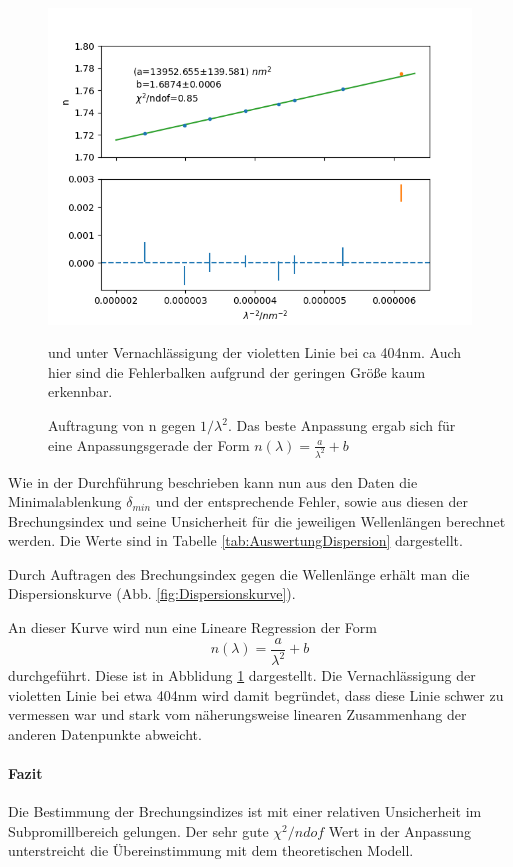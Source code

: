 \documentclass[12pt,a4paper]{article}
\begin{document}
	\begin{figure}
		\includegraphics[scale=1.0]{Bilder/Regression.png}
		\caption{Auftragung von n gegen $1/\lambda^2$. Das beste Anpassung ergab sich für eine Anpassungsgerade der Form $n(\lambda) = \frac{a}{\lambda^2} + b $} und unter Vernachlässigung der violetten Linie bei ca 404nm. Auch hier sind die Fehlerbalken aufgrund der geringen Größe kaum erkennbar.
		\label{fig:RegressionDispersion}
	\end{figure}
	
	
	Wie in der Durchführung beschrieben kann nun aus den Daten die Minimalablenkung $\delta_{min}$ und der entsprechende Fehler, sowie aus diesen der Brechungsindex und seine Unsicherheit für die jeweiligen Wellenlängen berechnet werden.
	Die Werte sind in Tabelle \ref{tab:AuswertungDispersion} dargestellt.
	
	Durch Auftragen des Brechungsindex gegen die Wellenlänge erhält man die Dispersionskurve (Abb. \ref{fig:Dispersionskurve}).
	
An dieser Kurve wird nun eine Lineare Regression der Form
\begin{equation}
n(\lambda) = \dfrac{a}{\lambda^2} + b
\label{eq:linreg_Prisma}
\end{equation} durchgeführt. Diese ist in Abblidung
\ref{fig:RegressionDispersion} dargestellt. Die Vernachlässigung der violetten Linie bei etwa 404nm wird damit begründet, dass diese Linie schwer zu vermessen war und stark vom näherungsweise linearen Zusammenhang der anderen Datenpunkte abweicht.

\paragraph{Fazit}
Die Bestimmung der Brechungsindizes ist mit einer relativen Unsicherheit im Subpromillbereich gelungen. Der sehr gute $\chi^2/ndof$ Wert in der Anpassung unterstreicht die Übereinstimmung mit dem theoretischen Modell.
\end{document}
